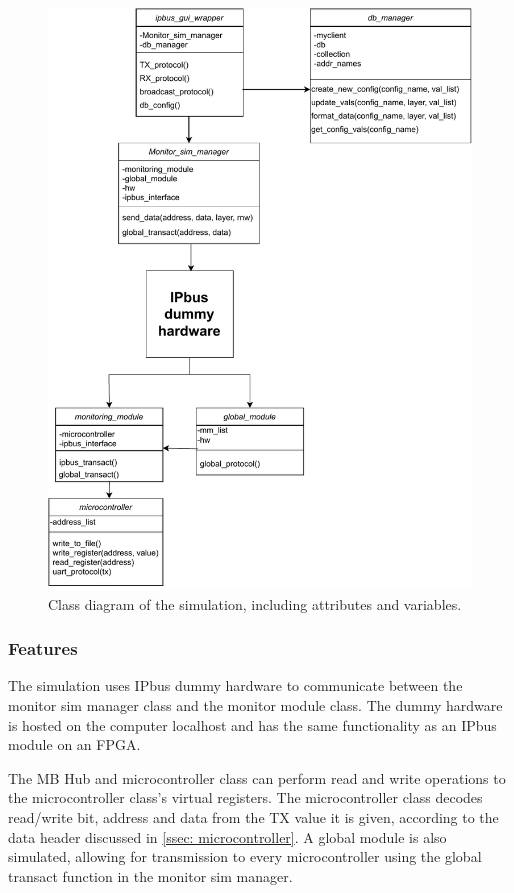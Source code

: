 \documentclass[main.tex]{subfiles}
\begin{document}
\begin{figure}[!ht]
    \centering
    \includegraphics[width=14cm]{images/class chart.pdf}
    \caption{Class diagram of the simulation, including attributes and variables.}
    \label{fig: class_diagram}
\end{figure}
\FloatBarrier


\subsubsection{Features}

The simulation uses IPbus dummy hardware to communicate between the monitor sim manager class and the monitor module class. The dummy hardware is hosted on the computer localhost and has the same functionality as an IPbus module on an FPGA.

The MB Hub and microcontroller class can perform read and write operations to the microcontroller class's virtual registers. The microcontroller class decodes read/write bit, address and data from the TX value it is given, according to the data header discussed in \autoref{ssec: microcontroller}. A global module is also simulated, allowing for transmission to every microcontroller using the global transact function in the monitor sim manager. 
\end{document}
